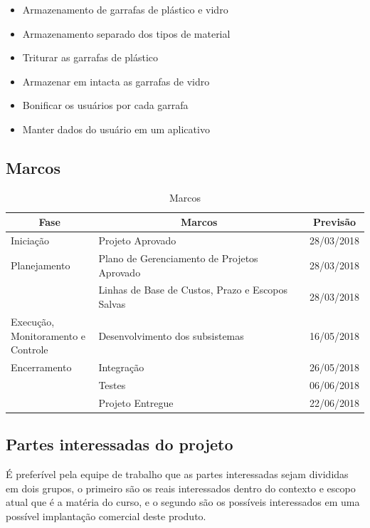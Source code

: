\begin{apendicesenv}
\begin{itemize}
    \item{Armazenamento de garrafas de plástico e vidro}
    \item{Armazenamento separado dos tipos de material}
    \item{Triturar as garrafas de plástico}
    \item{Armazenar em intacta as garrafas de vidro}
    \item{Bonificar os usuários por cada garrafa}
    \item{Manter dados do usuário em um aplicativo}
\end{itemize}

\subsection{Marcos}

\begin{table}[htp]
    \centering
    \caption{Marcos}
    \label{my-label}
    \begin{tabular}{|p{0.25\linewidth}|p{0.65\linewidth}|p{0.15\linewidth}|}
    \hline
    \multicolumn{1}{|c|}{\textbf{Fase}} & \multicolumn{1}{c|}{\textbf{Marcos}} & \multicolumn{1}{c|}{\textbf{Previsão}} \\ \hline
    Iniciação & Projeto Aprovado & 28/03/2018 \\ \hline
    Planejamento & Plano de Gerenciamento de Projetos Aprovado & 28/03/2018 \\ \hline
     & Linhas de Base de Custos, Prazo e Escopos Salvas & 28/03/2018 \\ \hline
    Execução, Monitoramento e Controle & Desenvolvimento dos subsistemas & 16/05/2018 \\ \hline
    Encerramento & Integração & 26/05/2018 \\ \hline
     & Testes & 06/06/2018 \\ \hline
     & Projeto Entregue & 22/06/2018 \\ \hline
    \end{tabular}
\end{table}

\subsection{Partes interessadas do projeto}

É preferível pela equipe de trabalho que as partes interessadas sejam divididas em dois grupos, o primeiro são os reais interessados dentro do contexto e escopo atual que é a matéria do curso, e o segundo são os possíveis interessados em uma possível implantação comercial deste produto.


\end{apendicesenv}
